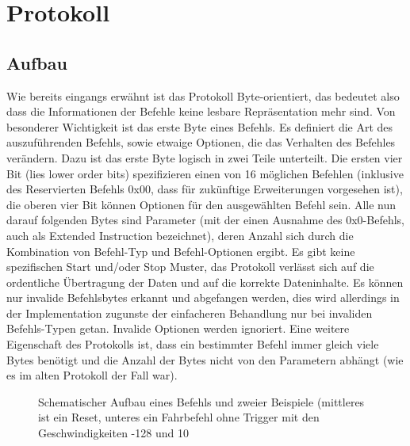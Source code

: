 \documentclass[a4paper]{article}
\begin{document}
	\section{Protokoll}

	\subsection{Aufbau}

	Wie bereits eingangs erwähnt ist das Protokoll Byte-orientiert, das bedeutet also dass die Informationen der Befehle keine
	lesbare Repräsentation mehr sind. Von besonderer Wichtigkeit ist das erste Byte eines Befehls. Es definiert die Art des
	auszuführenden Befehls, sowie etwaige Optionen, die das Verhalten des Befehles verändern. Dazu ist das erste Byte logisch
	in zwei Teile unterteilt. Die ersten vier Bit (lies lower order bits) spezifizieren einen von 16 möglichen Befehlen
	(inklusive des Reservierten Befehls 0x00, dass für zukünftige Erweiterungen vorgesehen ist), die oberen vier Bit können
	Optionen für den ausgewählten Befehl sein. Alle nun darauf folgenden Bytes sind Parameter (mit der einen Ausnahme des
	0x0-Befehls, auch als Extended Instruction bezeichnet), deren Anzahl sich durch die Kombination von Befehl-Typ und
	Befehl-Optionen ergibt.
	Es gibt keine spezifischen Start und/oder Stop Muster, das Protokoll verlässt sich auf die ordentliche Übertragung
	der Daten und auf die korrekte Dateninhalte. Es können nur invalide Befehlsbytes erkannt und abgefangen werden, dies wird
	allerdings in der Implementation zugunste der einfacheren Behandlung nur bei invaliden Befehls-Typen getan. Invalide
	Optionen werden ignoriert.
	Eine weitere Eigenschaft des Protokolls ist, dass ein bestimmter Befehl immer gleich viele Bytes benötigt und die Anzahl
	der Bytes nicht von den Parametern abhängt (wie es im alten Protokoll der Fall war).
	\begin{figure}[!ht]
		\centering
		\caption{Schematischer Aufbau eines Befehls und zweier Beispiele (mittleres ist ein Reset, unteres ein Fahrbefehl ohne
		Trigger mit den Geschwindigkeiten -128 und 10}
	\end{figure}
\end{document}
